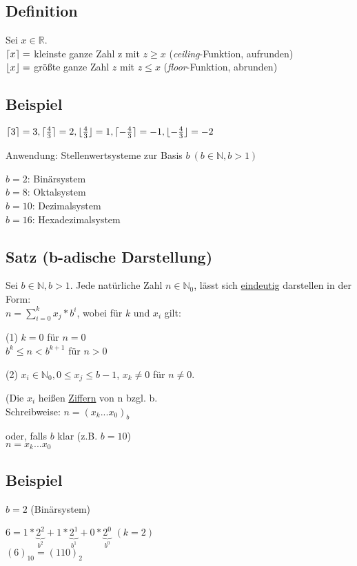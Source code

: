 \documentclass[a4paper, 12pt, twoside] {article}
\DeclarePairedDelimiter\ceil{\lceil}{\rceil}
\DeclarePairedDelimiter\floor{\lfloor}{\rfloor}
\begin{document}
\subsection{Definition}
Sei $x \in \mathbb{R}$. \\
$\ceil{x} = $ kleinste ganze Zahl z mit $z \geq x$
(\textit{ceiling}-Funktion, aufrunden) \\
$\floor{x} = $ größte ganze Zahl $z$ mit $z \leq x$ 
(\textit{floor}-Funktion, abrunden)

\subsection{Beispiel}
$\ceil{3} = 3, \ceil{\frac{4}{3}} = 2,  \floor{\frac{4}{3}} = 1, \ceil{-\frac{4}{3}} = -1, \floor {-\frac{4}{3}} = -2$

Anwendung: Stellenwertsysteme zur Basis $b\ (b \in \mathbb{N}, b > 1)$

$b = 2$: Binärsystem \\
$b = 8$: Oktalsystem \\
$b = 10$: Dezimalsystem \\
$b = 16$: Hexadezimalsystem

\subsection{Satz (b-adische Darstellung)}

Sei $b \in \mathbb{N}, b > 1$.
Jede natürliche Zahl $n \in \mathbb{N}_0$, lässt sich \underline{eindeutig} darstellen in der Form: \\
$n = \displaystyle\sum_{i=0}^{k} x_j * b^i$,
wobei für $k$ und $x_i$ gilt:

(1) $k = 0$ für $n = 0$ \\
$b^k \leq n < b^{k+1}$ für $n > 0$

(2) $x_i \in \mathbb{N}_0, 0 \leq x_j \leq b -1$,
$x_k \neq 0$ für $n \neq 0$.

(Die $x_i$ heißen \underline{Ziffern} von n bzgl. b. \\
Schreibweise: $n= (x_k ... x_0)_b$

oder, falls $b$ klar (z.B. $b = 10$) \\
$n = x_k...x_0$

\subsection{Beispiel}
$b = 2$ (Binärsystem)

$6 = 1*\underbrace{2^2}_{b^2} + 1*\underbrace{2^1}_{b^1} + 0*\underbrace{2^0}_{b^0}$ $(k = 2)$ \\
$(6)_{10} = (110)_2$
\end{document}
